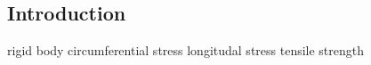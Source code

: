 
\subsection{Introduction}

rigid body
	circumferential stress
	longitudal stress
	tensile strength


